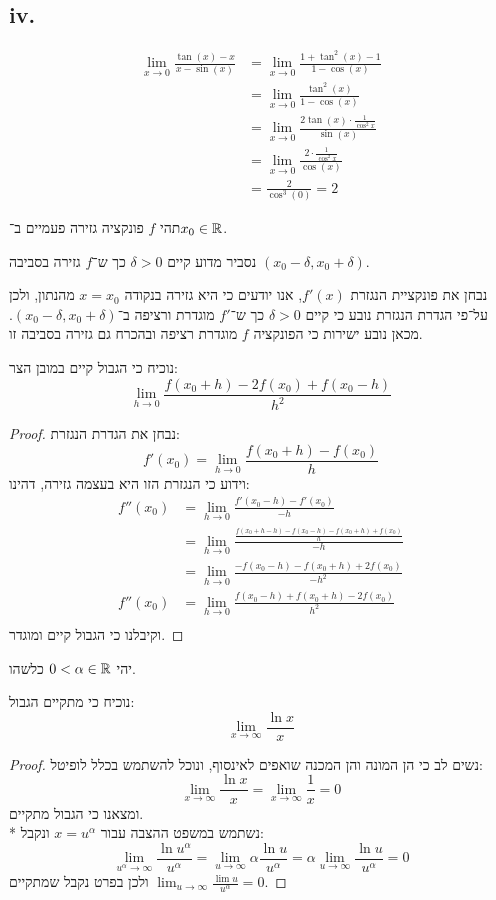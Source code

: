 \subsection{iv.}
\begin{align*}
	\lim_{x \to 0} \frac{\tan(x) - x}{x - \sin(x)}
	& = \lim_{x \to 0} \frac{1 + \tan^2(x) - 1}{1 - \cos(x)} \\
	& = \lim_{x \to 0} \frac{\tan^2(x)}{1 - \cos(x)} \\
	& = \lim_{x \to 0} \frac{2 \tan(x) \cdot \frac{1}{\cos^2 x}}{\sin(x)} \\
	& = \lim_{x \to 0} \frac{2 \cdot \frac{1}{\cos^2 x}}{\cos(x)} \\
	& = \frac{2}{\cos^3(0)} 
	= 2
\end{align*}

\Question{}
תהי $f$ פונקציה גזירה פעמיים ב־$x_0 \in \mathbb{R}$.

\Subquestion{}
נסביר מדוע קיים $\delta > 0$ כך ש־$f$ גזירה בסביבה $(x_0 - \delta, x_0 + \delta)$.

נבחן את פונקציית הנגזרת $f'(x)$, אנו יודעים כי היא גזירה בנקודה $x = x_0$ מהנתון, ולכן על־פי הגדרת הנגזרת נובע כי קיים $\delta > 0$ כך ש־$f'$ מוגדרת ורציפה ב־$(x_0 - \delta, x_0 + \delta)$.
מכאן נובע ישירות כי הפונקציה $f$ מוגדרת רציפה ובהכרח גם גזירה בסביבה זו.

\Subquestion{}
נוכיח כי הגבול קיים במובן הצר:
\[
	\lim_{h \to 0} \frac{f(x_0 + h) - 2f(x_0) + f(x_0 - h)}{h^2}
\]
\begin{proof}
	נבחן את הגדרת הנגזרת:
	\[
		f'(x_0) = \lim_{h \to 0} \frac{f(x_0 + h) - f(x_0)}{h}
	\]
	וידוע כי הנגזרת הזו היא בעצמה גזירה, דהינו:
	\begin{align*}
		f''(x_0)
		& = \lim_{h \to 0} \frac{f'(x_0 - h) - f'(x_0)}{-h} \\
		& = \lim_{h \to 0} \frac{\frac{f(x_0 + h - h) - f(x_0 - h) - f(x_0 + h) + f(x_0)}{h}}{-h} \\
		& = \lim_{h \to 0} \frac{-f(x_0 - h) - f(x_0 + h) + 2f(x_0)}{-h^2} \\
		f''(x_0) & = \lim_{h \to 0} \frac{f(x_0 - h) + f(x_0 + h) - 2f(x_0)}{h^2} \\
	\end{align*}
	וקיבלנו כי הגבול קיים ומוגדר.
\end{proof}

\Question{}
יהי $0 < \alpha \in \mathbb{R}$ כלשהו.

\Subquestion{}
נוכיח כי מתקיים הגבול:
\[
	\lim_{x \to \infty} \frac{\ln x}{x}
\]
\begin{proof}
	נשים לב כי הן המונה והן המכנה שואפים לאינסוף, ונוכל להשתמש בכלל לופיטל:
	\[
		\lim_{x \to \infty} \frac{\ln x}{x}
		= \lim_{x \to \infty} \frac{1}{x}
		= 0
	\]
	ומצאנו כי הגבול מתקיים. \\*
	נשתמש במשפט ההצבה עבור $x = u^\alpha$ ונקבל:
	\[
		\lim_{u^\alpha \to \infty} \frac{\ln u^\alpha}{u^\alpha}
		= \lim_{u \to \infty} \alpha \frac{\ln u}{u^\alpha}
		= \alpha \lim_{u \to \infty} \frac{\ln u}{u^\alpha}
		= 0
	\]
	ולכן בפרט נקבל שמתקיים $\lim_{u \to \infty} \frac{\lim u}{u^\alpha} = 0$.
\end{proof}

